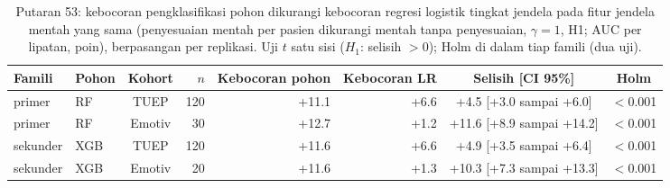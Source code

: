 \begin{table}[!htbp]
\caption{Putaran 53: kebocoran pengklasifikasi pohon dikurangi kebocoran regresi logistik tingkat jendela pada fitur jendela mentah yang sama (penyesuaian mentah per pasien dikurangi mentah tanpa penyesuaian, $\gamma=1$, H1; AUC per lipatan, poin), berpasangan per replikasi. Uji $t$ satu sisi ($H_1$: selisih $>0$); Holm di dalam tiap famili (dua uji).}\label{tab:s2_p53}
\centering\scriptsize
\setlength{\tabcolsep}{3pt}
\begin{tabular}{llcrrrcc}
\toprule
Famili & Pohon & Kohort & $n$ & Kebocoran pohon & Kebocoran LR & Selisih [CI 95\%] & Holm \\
\midrule
primer & RF & TUEP & 120 & +11.1 & +6.6 & +4.5 [+3.0 sampai +6.0] & $<$0.001 \\
primer & RF & Emotiv & 30 & +12.7 & +1.2 & +11.6 [+8.9 sampai +14.2] & $<$0.001 \\
sekunder & XGB & TUEP & 120 & +11.6 & +6.6 & +4.9 [+3.5 sampai +6.4] & $<$0.001 \\
sekunder & XGB & Emotiv & 20 & +11.6 & +1.3 & +10.3 [+7.3 sampai +13.3] & $<$0.001 \\
\bottomrule
\end{tabular}
\end{table}
